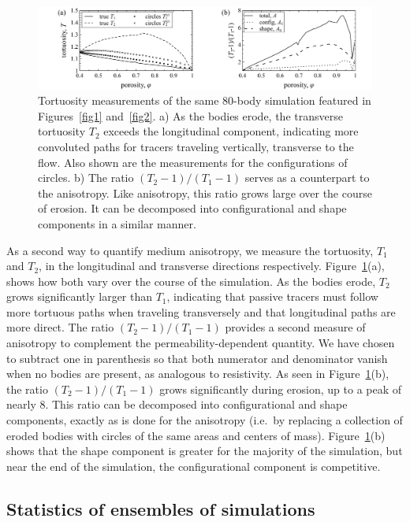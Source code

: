 \documentclass[3p]{elsarticle}
\begin{document}
\begin{figure}%
\centering
\includegraphics[width = 0.99 \textwidth]{./figs/fig4.pdf}
\caption{
Tortuosity measurements of the same 80-body simulation featured in Figures~\ref{fig1} and~\ref{fig2}. a) As the bodies erode, the transverse tortuosity $T_2$ exceeds the longitudinal component, indicating more convoluted paths for tracers traveling vertically, transverse to the flow. Also shown are the measurements for the configurations of circles. b) The ratio $(T_2-1)/(T_1-1)$ serves as a counterpart to the anisotropy. Like anisotropy, this ratio grows large over the course of erosion. It can be decomposed into configurational and shape components in a similar manner.
\label{fig4}
}
\end{figure}

As a second way to quantify medium anisotropy, we measure the
tortuosity, $T_1$ and $T_2$, in the longitudinal and transverse
directions respectively. Figure~\ref{fig4}(a), shows how both vary over
the course of the simulation. As the bodies erode, $T_2$ grows
significantly larger than $T_1$, indicating that passive tracers must
follow more tortuous paths when traveling transversely and that
longitudinal paths are more direct. The ratio $(T_2-1)/(T_1-1)$ provides
a second measure of anisotropy to complement the permeability-dependent
quantity. We have chosen to subtract one in parenthesis so that both
numerator and denominator vanish when no bodies are present, as
analogous to resistivity. As seen in Figure~\ref{fig4}(b), the ratio $(T_2-1)/(T_1-1)$ grows significantly during erosion, up to a peak of nearly 8. This ratio can be decomposed into configurational and shape components, exactly as is done for the anisotropy (i.e.~by replacing a collection of eroded bodies with circles of the same areas and centers of mass). Figure~\ref{fig4}(b) shows that the shape component is greater for the majority of the simulation, but near the end of the simulation, the configurational component is competitive. 


\subsection{Statistics of ensembles of simulations}
\end{document}

